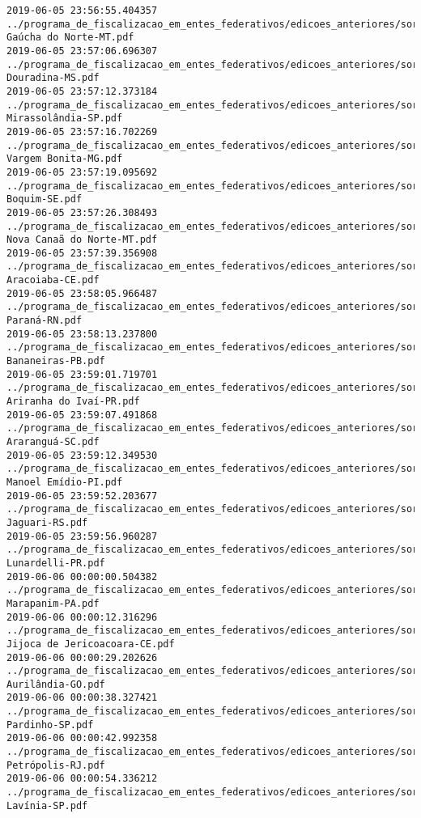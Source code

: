 \begin{lstlisting}
2019-06-05 23:56:55.404357 ../programa_de_fiscalizacao_em_entes_federativos/edicoes_anteriores/sorteio_38/3004-Gaúcha do Norte-MT.pdf
2019-06-05 23:57:06.696307 ../programa_de_fiscalizacao_em_entes_federativos/edicoes_anteriores/sorteio_38/3001-Douradina-MS.pdf
2019-06-05 23:57:12.373184 ../programa_de_fiscalizacao_em_entes_federativos/edicoes_anteriores/sorteio_38/3066-Mirassolândia-SP.pdf
2019-06-05 23:57:16.702269 ../programa_de_fiscalizacao_em_entes_federativos/edicoes_anteriores/sorteio_38/2997-Vargem Bonita-MG.pdf
2019-06-05 23:57:19.095692 ../programa_de_fiscalizacao_em_entes_federativos/edicoes_anteriores/sorteio_38/3054-Boquim-SE.pdf
2019-06-05 23:57:26.308493 ../programa_de_fiscalizacao_em_entes_federativos/edicoes_anteriores/sorteio_38/3006-Nova Canaã do Norte-MT.pdf
2019-06-05 23:57:39.356908 ../programa_de_fiscalizacao_em_entes_federativos/edicoes_anteriores/sorteio_38/2969-Aracoiaba-CE.pdf
2019-06-05 23:58:05.966487 ../programa_de_fiscalizacao_em_entes_federativos/edicoes_anteriores/sorteio_38/3038-Paraná-RN.pdf
2019-06-05 23:58:13.237800 ../programa_de_fiscalizacao_em_entes_federativos/edicoes_anteriores/sorteio_38/3014-Bananeiras-PB.pdf
2019-06-05 23:59:01.719701 ../programa_de_fiscalizacao_em_entes_federativos/edicoes_anteriores/sorteio_38/3028-Ariranha do Ivaí-PR.pdf
2019-06-05 23:59:07.491868 ../programa_de_fiscalizacao_em_entes_federativos/edicoes_anteriores/sorteio_38/3050-Araranguá-SC.pdf
2019-06-05 23:59:12.349530 ../programa_de_fiscalizacao_em_entes_federativos/edicoes_anteriores/sorteio_38/3026-Manoel Emídio-PI.pdf
2019-06-05 23:59:52.203677 ../programa_de_fiscalizacao_em_entes_federativos/edicoes_anteriores/sorteio_38/3046-Jaguari-RS.pdf
2019-06-05 23:59:56.960287 ../programa_de_fiscalizacao_em_entes_federativos/edicoes_anteriores/sorteio_38/3030-Lunardelli-PR.pdf
2019-06-06 00:00:00.504382 ../programa_de_fiscalizacao_em_entes_federativos/edicoes_anteriores/sorteio_39/3176-Marapanim-PA.pdf
2019-06-06 00:00:12.316296 ../programa_de_fiscalizacao_em_entes_federativos/edicoes_anteriores/sorteio_39/3138-Jijoca de Jericoacoara-CE.pdf
2019-06-06 00:00:29.202626 ../programa_de_fiscalizacao_em_entes_federativos/edicoes_anteriores/sorteio_39/3146-Aurilândia-GO.pdf
2019-06-06 00:00:38.327421 ../programa_de_fiscalizacao_em_entes_federativos/edicoes_anteriores/sorteio_39/3234-Pardinho-SP.pdf
2019-06-06 00:00:42.992358 ../programa_de_fiscalizacao_em_entes_federativos/edicoes_anteriores/sorteio_39/3200-Petrópolis-RJ.pdf
2019-06-06 00:00:54.336212 ../programa_de_fiscalizacao_em_entes_federativos/edicoes_anteriores/sorteio_39/3232-Lavínia-SP.pdf

\end{lstlisting}

